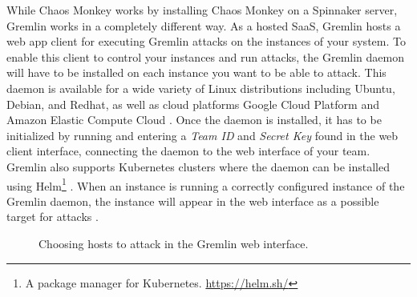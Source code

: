 \documentclass{article}
\begin{document}
While Chaos Monkey works by installing Chaos Monkey on a Spinnaker server, Gremlin works in a completely different way. As a hosted SaaS, Gremlin hosts a web app client for executing Gremlin attacks on the instances of your system. To enable this client to control your instances and run attacks, the Gremlin daemon will have to be installed on each instance you want to be able to attack. This daemon is available for a wide variety of Linux distributions including Ubuntu, Debian, and Redhat, as well as cloud platforms Google Cloud Platform and Amazon Elastic Compute Cloud \cite{gremlinManual}. Once the daemon is installed, it has to be initialized by running and entering a \textit{Team ID} and \textit{Secret Key} found in the web client interface, connecting the daemon to the web interface of your team. Gremlin also supports Kubernetes clusters where the daemon can be installed using Helm\footnote{A package manager for Kubernetes. \url{https://helm.sh/}} \cite{gremlinKubernetes}. When an instance is running a correctly configured instance of the Gremlin daemon, the instance will appear in the web interface as a possible target for attacks \cite{gremlinManual}.

\begin{figure}[h]
    \caption{Choosing hosts to attack in the Gremlin web interface.}
    \centering
    \label{fig:gremlinTargets}
\end{figure}
\end{document}
